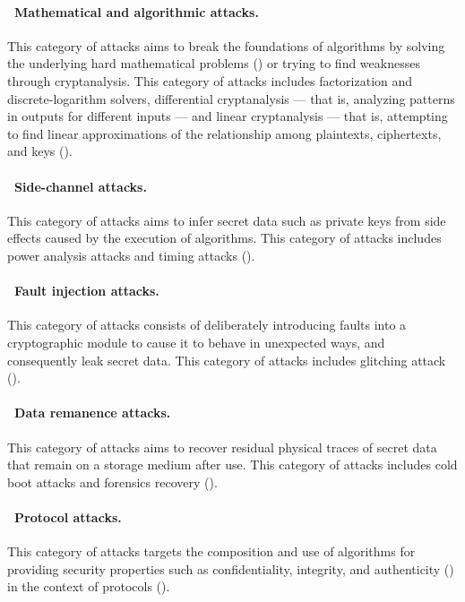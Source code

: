 \paragraph*{\faCalculator~Mathematical and algorithmic attacks.} This category of attacks aims to break the foundations of algorithms by solving the underlying hard mathematical problems () or trying to find weaknesses through cryptanalysis. This category of attacks includes factorization and discrete-logarithm solvers, differential cryptanalysis --- that is, analyzing patterns in outputs for different inputs --- and linear cryptanalysis --- that is, attempting to find linear approximations of the relationship among plaintexts, ciphertexts, and keys ().

\paragraph*{\faHourglassHalf~Side-channel attacks.} This category of attacks aims to infer secret data such as private keys from side effects caused by the execution of algorithms. This category of attacks includes power analysis attacks and timing attacks ().

\paragraph*{\faExclamation~Fault injection attacks.} This category of attacks consists of deliberately introducing faults into a cryptographic module to cause it to behave in unexpected ways, and consequently leak secret data. This category of attacks includes glitching attack ().

\paragraph*{\faDatabase~Data remanence attacks.} This category of attacks aims to recover residual physical traces of secret data that remain on a storage medium after use. This category of attacks includes cold boot attacks and forensics recovery ().

\paragraph*{\faEnvelope~Protocol attacks.} This category of attacks targets the composition and use of algorithms for providing security properties such as confidentiality, integrity, and authenticity () in the context of protocols ().

